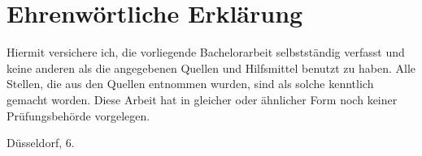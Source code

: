 
\chapter*{Ehrenwörtliche Erklärung}

Hiermit versichere ich, die vorliegende Bachelorarbeit selbstständig 
verfasst und keine anderen als die angegebenen Quellen und Hilfsmittel
benutzt zu haben.
Alle Stellen, die aus den Quellen entnommen
wurden, sind als solche kenntlich gemacht worden. Diese Arbeit hat in
gleicher oder ähnlicher Form noch keiner Prüfungsbehörde vorgelegen.

\vspace{3cm}

\noindent Düsseldorf, 6.\thesissubmissionmonth{} \thesissubmissionyear{} \hfill \thesisauthor{}
